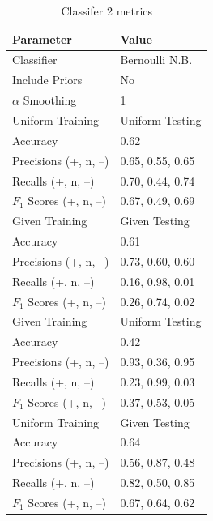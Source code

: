 \documentclass[11pt]{article}
\begin{document}
\begin{table}[H]
	\begin{center}
		\begin{tabular}{|l|l|}			
			\hline
			Parameter & Value \\
			\hline
			Classifier & Bernoulli N.B. \\
			Include Priors & No \\
			$\alpha$ Smoothing & 1 \\
			\hline\hline
			Uniform Training & Uniform Testing \\
			\hline
			Accuracy & 0.62 \\
			Precisions (+, n, --) 	& 0.65, 0.55, 0.65 \\
			Recalls (+, n, --) 		& 0.70, 0.44, 0.74 \\
			$F_1$ Scores (+, n, --) & 0.67, 0.49, 0.69 \\
			\hline\hline
			Given Training & Given Testing \\
			\hline
			Accuracy & 0.61 \\
			Precisions (+, n, --) 	& 0.73, 0.60, 0.60 \\
			Recalls (+, n, --) 		& 0.16, 0.98, 0.01 \\
			$F_1$ Scores (+, n, --) & 0.26, 0.74, 0.02 \\
			\hline\hline
			Given Training & Uniform Testing \\
			\hline
			Accuracy & 0.42 \\
			Precisions (+, n, --) 	& 0.93, 0.36, 0.95 \\
			Recalls (+, n, --) 		& 0.23, 0.99, 0.03 \\
			$F_1$ Scores (+, n, --) & 0.37, 0.53, 0.05 \\
			\hline\hline
			Uniform Training & Given Testing \\
			\hline
			Accuracy & 0.64 \\
			Precisions (+, n, --) 	& 0.56, 0.87, 0.48 \\
			Recalls (+, n, --) 		& 0.82, 0.50, 0.85 \\
			$F_1$ Scores (+, n, --) & 0.67, 0.64, 0.62 \\
			\hline
		\end{tabular}
		\caption{Classifer 2 metrics}
		\label{tbl:metrics-2nd10000}
	\end{center}
\end{table}

\end{document}
